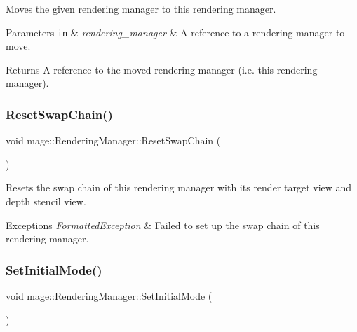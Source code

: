 Moves the given rendering manager to this rendering manager.


\begin{DoxyParams}[1]{Parameters}
\mbox{\tt in}  & {\em rendering\+\_\+manager} & A reference to a rendering manager to move. \\
\hline
\end{DoxyParams}
\begin{DoxyReturn}{Returns}
A reference to the moved rendering manager (i.\+e. this rendering manager). 
\end{DoxyReturn}
\hypertarget{classmage_1_1_rendering_manager_a61c6166ea8a5cd7646d1bd91b182cb7d}{}\label{classmage_1_1_rendering_manager_a61c6166ea8a5cd7646d1bd91b182cb7d} 
\subsubsection{\texorpdfstring{Reset\+Swap\+Chain()}{ResetSwapChain()}}
{\footnotesize\ttfamily void mage\+::\+Rendering\+Manager\+::\+Reset\+Swap\+Chain (\begin{DoxyParamCaption}{ }\end{DoxyParamCaption})\hspace{0.3cm}{\ttfamily [private]}}

Resets the swap chain of this rendering manager with its render target view and depth stencil view.


\begin{DoxyExceptions}{Exceptions}
{\em \hyperlink{structmage_1_1_formatted_exception}{Formatted\+Exception}} & Failed to set up the swap chain of this rendering manager. \\
\hline
\end{DoxyExceptions}
\hypertarget{classmage_1_1_rendering_manager_a4a419cda665fd7a8c6605a67640dea01}{}\label{classmage_1_1_rendering_manager_a4a419cda665fd7a8c6605a67640dea01} 
\subsubsection{\texorpdfstring{Set\+Initial\+Mode()}{SetInitialMode()}}
{\footnotesize\ttfamily void mage\+::\+Rendering\+Manager\+::\+Set\+Initial\+Mode (\begin{DoxyParamCaption}{ }\end{DoxyParamCaption})\hspace{0.3cm}{\ttfamily [noexcept]}}

